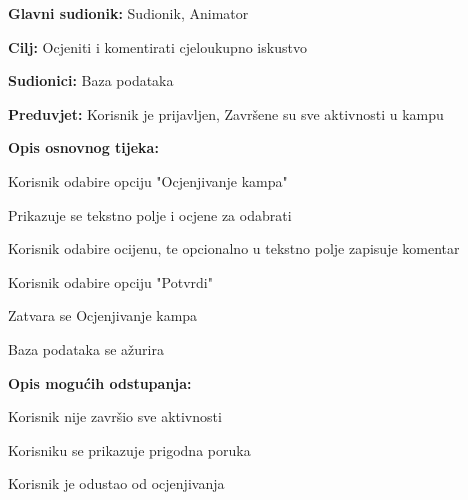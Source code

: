 					\noindent {}
					\begin{packed_item}
						
						\item \textbf{Glavni sudionik: } Sudionik, Animator
						\item  \textbf{Cilj:} Ocjeniti i komentirati cjeloukupno iskustvo
						\item  \textbf{Sudionici:} Baza podataka
						\item  \textbf{Preduvjet:} Korisnik je prijavljen, Završene su sve aktivnosti u kampu
						\item  \textbf{Opis osnovnog tijeka:}
						
						\item[] \begin{packed_enum}
							
							\item Korisnik odabire opciju "Ocjenjivanje kampa"
							\item Prikazuje se tekstno polje i ocjene za odabrati
							\item Korisnik odabire ocijenu, te opcionalno u tekstno polje zapisuje komentar
							\item Korisnik odabire opciju "Potvrdi"
							\item Zatvara se Ocjenjivanje kampa
							\item Baza podataka se ažurira
						\end{packed_enum}
						
						\item  \textbf{Opis mogućih odstupanja:}
						
						\item[] \begin{packed_item}
							
							\item[1.a] Korisnik nije završio sve aktivnosti
							\item[] \begin{packed_enum}
								
								\item Korisniku se prikazuje prigodna poruka
								
							\end{packed_enum}
							\item[3.a] Korisnik je odustao od ocjenjivanja
							\item[] \begin{packed_enum}
								

\end{packed_enum}
\end{packed_item}
\end{packed_item}
